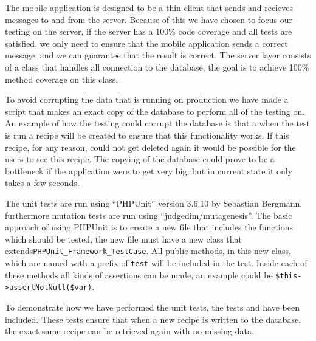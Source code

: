 The mobile application is designed to be a thin client that sends and recieves messages to and from the server. Because of this we have chosen to focus our testing on the server, if the server has a 100\% code coverage and all tests are satisfied, we only need to ensure that the mobile application sends a correct message, and we can guarantee that the result is correct.
The server layer consists of a class that handles all connection to the database, the goal is to achieve 100\% method coverage on this class.

To avoid corrupting the data that is running on production we have made a script that makes an exact copy of the database to perform all of the testing on. An example of how the testing could corrupt the database is that a when the test is run a recipe will be created to ensure that this functionality works. If this recipe, for any reason, could not get deleted again it would be possible for the users to see this recipe. The copying of the database could prove to be a bottleneck if the application were to get very big, but in current state it only takes a few seconds.

The unit tests are run using ``PHPUnit'' version 3.6.10 by Sebastian Bergmann\cite{phpunit}, furthermore mutation tests are run using ``judgedim/mutagenesis''\cite{mutagenesis}. The basic approach of using PHPUnit is to create a new file that includes the functions which should be tested, the new file must have a new class that extends\linebreak \lstinline|PHPUnit_Framework_TestCase|. All public methods, in this new class, which are named with a prefix of \lstinline|test| will be included in the test. Inside each of these methods all kinds of assertions can be made, an example could be \lstinline|$this->assertNotNull($var)|\citep{phpunit}.

To demonstrate how we have performed the unit tests, the tests  and  have been included. These tests ensure that when a new recipe is written to the database, the exact same recipe can be retrieved again with no missing data.

